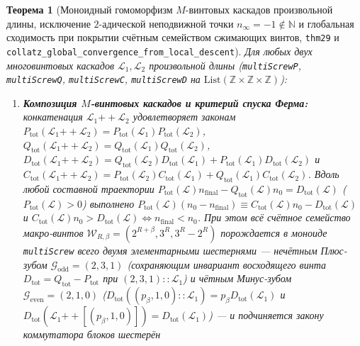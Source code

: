 \documentclass[11pt,a4paper]{article}
\newtheorem{theorem}{Теорема}[section]
\theoremstyle{definition}
\theoremstyle{remark}
\begin{document}
\begin{theorem}[Моноидный гомоморфизм $M$-винтовых каскадов произвольной длины, исключение $2$-адической неподвижной точки $n_\infty = -1 \notin \mathbb{N}$ и глобальная сходимость при покрытии счётным семейством сжимающих винтов, \texttt{thm29} и \texttt{collatz\_global\_convergence\_from\_local\_descent}]
\label{thm:countable-multi-screw-cascade}
Для любых двух многовинтовых каскадов $\mathcal{L}_1,\mathcal{L}_2$ произвольной длины (\texttt{multiScrewP}, \texttt{multiScrewQ}, \texttt{multiScrewC}, \texttt{multiScrewD} на $\mathrm{List}(\mathbb{Z}\times\mathbb{Z}\times\mathbb{Z})$):
\begin{enumerate}[label=\textbf{(\roman*)},leftmargin=*,noitemsep]
\item \textbf{Композиция $M$-винтовых каскадов и критерий спуска Ферма:}
  конкатенация $\mathcal{L}_1\mathbin{++}\mathcal{L}_2$ удовлетворяет законам $P_{\mathrm{tot}}(\mathcal{L}_1\mathbin{++}\mathcal{L}_2) = P_{\mathrm{tot}}(\mathcal{L}_1)P_{\mathrm{tot}}(\mathcal{L}_2)$, $Q_{\mathrm{tot}}(\mathcal{L}_1\mathbin{++}\mathcal{L}_2) = Q_{\mathrm{tot}}(\mathcal{L}_1)Q_{\mathrm{tot}}(\mathcal{L}_2)$, $D_{\mathrm{tot}}(\mathcal{L}_1\mathbin{++}\mathcal{L}_2) = Q_{\mathrm{tot}}(\mathcal{L}_2)D_{\mathrm{tot}}(\mathcal{L}_1) + P_{\mathrm{tot}}(\mathcal{L}_1)D_{\mathrm{tot}}(\mathcal{L}_2)$ и $C_{\mathrm{tot}}(\mathcal{L}_1\mathbin{++}\mathcal{L}_2) = P_{\mathrm{tot}}(\mathcal{L}_2)C_{\mathrm{tot}}(\mathcal{L}_1) + Q_{\mathrm{tot}}(\mathcal{L}_1)C_{\mathrm{tot}}(\mathcal{L}_2)$. Вдоль любой составной траектории $P_{\mathrm{tot}}(\mathcal{L})n_{\mathrm{final}} - Q_{\mathrm{tot}}(\mathcal{L})n_0 = D_{\mathrm{tot}}(\mathcal{L})$ ($P_{\mathrm{tot}}(\mathcal{L}) > 0$) выполнено $P_{\mathrm{tot}}(\mathcal{L})(n_0 - n_{\mathrm{final}}) \equiv C_{\mathrm{tot}}(\mathcal{L})n_0 - D_{\mathrm{tot}}(\mathcal{L})$ и $C_{\mathrm{tot}}(\mathcal{L})n_0 > D_{\mathrm{tot}}(\mathcal{L}) \iff n_{\mathrm{final}} < n_0$. При этом всё счётное семейство макро-винтов $\mathcal{W}_{R,\beta} = (2^{R+\beta},3^R,3^R-2^R)$ порождается в моноиде \texttt{multiScrew} всего двумя элементарными шестернями — нечётным Плюс-зубом $\mathcal{G}_{\mathrm{odd}}=(2,3,1)$ (сохраняющим инвариант восходящего винта $D_{\mathrm{tot}}=Q_{\mathrm{tot}}-P_{\mathrm{tot}}$ при $(2,3,1)::\mathcal{L}_1$) и чётным Минус-зубом $\mathcal{G}_{\mathrm{even}}=(2,1,0)$ ($D_{\mathrm{tot}}((p_\beta,1,0)::\mathcal{L}_1)=p_\beta D_{\mathrm{tot}}(\mathcal{L}_1)$ и $D_{\mathrm{tot}}(\mathcal{L}_1\mathbin{++}[(p_\beta,1,0)])=D_{\mathrm{tot}}(\mathcal{L}_1)$) — и подчиняется закону коммутатора блоков шестерён

\end{enumerate}
\end{theorem}
\end{document}
